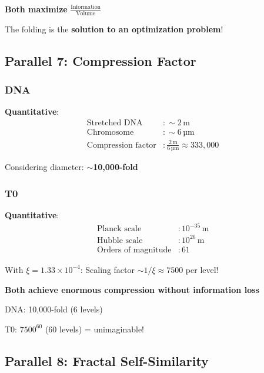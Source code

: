 	\begin{keyresult}
		\textbf{Both maximize} $\frac{\text{Information}}{\text{Volume}}$
		
		The folding is the \textbf{solution to an optimization problem}!
	\end{keyresult}
	
	\subsection{Parallel 7: Compression Factor}
	
	\subsubsection{DNA}
	
	\textbf{Quantitative}:
	\begin{align}
		\text{Stretched DNA} &: \sim 2\,\text{m} \\
		\text{Chromosome} &: \sim 6\,\text{µm} \\
		\text{Compression factor} &: \frac{2\,\text{m}}{6\,\text{µm}} \approx 333,000
	\end{align}
	
	Considering diameter: $\sim$\textbf{10,000-fold}
	
	\subsubsection{T0}
	
	\textbf{Quantitative}:
	\begin{align}
		\text{Planck scale} &: 10^{-35}\,\text{m} \\
		\text{Hubble scale} &: 10^{26}\,\text{m} \\
		\text{Orders of magnitude} &: 61
	\end{align}
	
	With $\xi = 1.33 \times 10^{-4}$: Scaling factor $\sim 1/\xi \approx 7500$ per level!
	
	\begin{keyresult}
		\textbf{Both achieve enormous compression without information loss}
		
		DNA: 10,000-fold (6 levels)
		
		T0: $7500^{60}$ (60 levels) = unimaginable!
	\end{keyresult}
	
	\subsection{Parallel 8: Fractal Self-Similarity}
	
